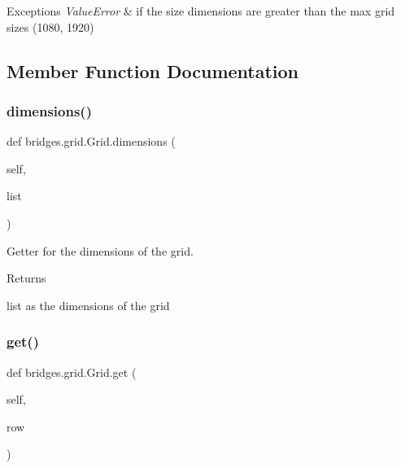 \begin{DoxyExceptions}{Exceptions}
{\em Value\+Error} & if the size dimensions are greater than the max grid sizes (1080, 1920) \\
\hline
\end{DoxyExceptions}


\subsection{Member Function Documentation}
\mbox{\label{classbridges_1_1grid_1_1_grid_a48f2107f2a2e970ada851012019a01dc}} 
\subsubsection{\texorpdfstring{dimensions()}{dimensions()}}
{\footnotesize\ttfamily def bridges.\+grid.\+Grid.\+dimensions (\begin{DoxyParamCaption}\item[{}]{self,  }\item[{}]{list }\end{DoxyParamCaption})}



Getter for the dimensions of the grid. 

\begin{DoxyReturn}{Returns}


list as the dimensions of the grid 
\end{DoxyReturn}
\mbox{\label{classbridges_1_1grid_1_1_grid_a354c049fedceef226ff62aedf78c2a72}} 
\subsubsection{\texorpdfstring{get()}{get()}}
{\footnotesize\ttfamily def bridges.\+grid.\+Grid.\+get (\begin{DoxyParamCaption}\item[{}]{self,  }\item[{}]{row }\end{DoxyParamCaption})}



